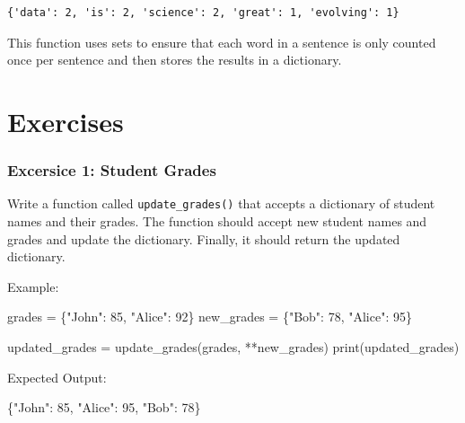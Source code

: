\documentclass[
  letterpaper,
  DIV=11,
  numbers=noendperiod]{scrreprt}
\newenvironment{Shaded}{\begin{snugshade}}{\end{snugshade}}
\newcommand{\BuiltInTok}[1]{\textcolor[rgb]{0.00,0.23,0.31}{#1}}
\newcommand{\DecValTok}[1]{\textcolor[rgb]{0.68,0.00,0.00}{#1}}
\newcommand{\NormalTok}[1]{\textcolor[rgb]{0.00,0.23,0.31}{#1}}
\newcommand{\OperatorTok}[1]{\textcolor[rgb]{0.37,0.37,0.37}{#1}}
\newcommand{\StringTok}[1]{\textcolor[rgb]{0.13,0.47,0.30}{#1}}
\begin{document}
\begin{verbatim}
{'data': 2, 'is': 2, 'science': 2, 'great': 1, 'evolving': 1}
\end{verbatim}

This function uses sets to ensure that each word in a sentence is only
counted once per sentence and then stores the results in a dictionary.

\hypertarget{exercises-7}{%
\section{Exercises}\label{exercises-7}}

\hypertarget{excersice-1-student-grades}{%
\subsubsection{Excersice 1: Student
Grades}\label{excersice-1-student-grades}}

Write a function called \texttt{update\_grades()} that accepts a
dictionary of student names and their grades. The function should accept
new student names and grades and update the dictionary. Finally, it
should return the updated dictionary.

Example:

\begin{Shaded}
\begin{Highlighting}[]
\NormalTok{grades }\OperatorTok{=}\NormalTok{ \{}\StringTok{"John"}\NormalTok{: }\DecValTok{85}\NormalTok{, }\StringTok{"Alice"}\NormalTok{: }\DecValTok{92}\NormalTok{\}}
\NormalTok{new\_grades }\OperatorTok{=}\NormalTok{ \{}\StringTok{"Bob"}\NormalTok{: }\DecValTok{78}\NormalTok{, }\StringTok{"Alice"}\NormalTok{: }\DecValTok{95}\NormalTok{\}}

\NormalTok{updated\_grades }\OperatorTok{=}\NormalTok{ update\_grades(grades, }\OperatorTok{**}\NormalTok{new\_grades)}
\BuiltInTok{print}\NormalTok{(updated\_grades)}
\end{Highlighting}
\end{Shaded}

Expected Output:

\begin{Shaded}
\begin{Highlighting}[]
\NormalTok{\{}\StringTok{"John"}\NormalTok{: }\DecValTok{85}\NormalTok{, }\StringTok{"Alice"}\NormalTok{: }\DecValTok{95}\NormalTok{, }\StringTok{"Bob"}\NormalTok{: }\DecValTok{78}\NormalTok{\}}
\end{Highlighting}
\end{Shaded}
\end{document}
